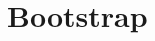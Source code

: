 \documentclass[xcolor=svgnames,9pt,english,aspectratio=169,t]{beamer}
\begin{document}
\section{Bootstrap}



\end{document}
